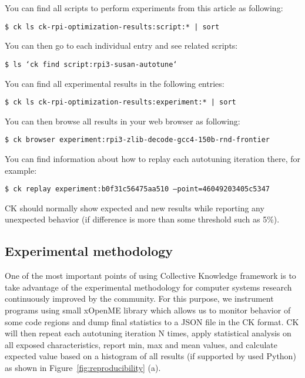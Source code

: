 You can find all scripts to perform experiments from this article as following:

\begin{flushleft}
\texttt{\$ ck ls ck-rpi-optimization-results:script:* | sort}
\end{flushleft}

You can then go to each individual entry and see related scripts:
\begin{flushleft}
\texttt{\$ ls `ck find script:rpi3-susan-autotune`}
\end{flushleft}

You can find all experimental results in the following entries:
\begin{flushleft}
\texttt{\$ ck ls ck-rpi-optimization-results:experiment:* | sort}
\end{flushleft}

You can then browse all results in your web browser as following:
\begin{flushleft}
\texttt{\$ ck browser experiment:rpi3-zlib-decode-gcc4-150b-rnd-frontier}
\end{flushleft}

You can find information about how to replay each autotuning iteration there, for example:
\begin{flushleft}
\texttt{\$ ck replay experiment:b0f31c56475aa510 --point=46049203405c5347}
\end{flushleft}

CK should normally show expected and new results while reporting any unexpected 
behavior (if difference is more than some threshold such as 5\%).

\subsection{Experimental methodology}
\label{experimental_methodology}

One of the most important points of using Collective Knowledge framework
is to take advantage of the experimental methodology for computer systems research
continuously improved by the community.
%
For this purpose, we instrument programs using small xOpenME library
which allows us to monitor behavior of some code regions and dump 
final statistics to a JSON file in the CK format.
%
CK will then repeat each autotuning iteration N times,
apply statistical analysis on all exposed characteristics, report min, max and mean values,
and calculate expected value based on a histogram of all results (if supported by used Python)
as shown in Figure~\ref{fig:reproducibility} (a).

